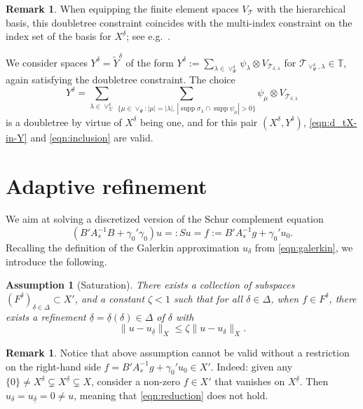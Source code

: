 \documentclass[11pt,a4paper,oneside,english]{amsart}
\numberwithin{equation}{section}
\numberwithin{theorem}{section}
\newtheorem{assum}[theorem]{Assumption}
\theoremstyle{definition}
\newtheorem{remark}[theorem]{Remark}
\DeclareMathOperator{\supp}{supp}
\newcommand{\T}{\mathcal{T}}
\newcommand{\udelta}{{\underline{\delta}}}
\begin{document}
\begin{remark}
  When equipping the finite element spaces $V_{\T}$ with the hierarchical basis,
  this doubletree constraint coincides with the multi-index constraint on the index
  set of the basis for $X^\delta$; see e.g.~\cite{TODO}.
\end{remark}

We consider spaces $Y^\delta = \tilde Y^\delta$ of the form
$Y^\delta := \sum_{\lambda \in \vee^\delta_\Psi} \psi_\lambda \otimes V_{\T_{\delta, \lambda}}$
for $\T_{\vee^\delta_\Psi, \lambda} \in \mathbb T$, again satisfying the doubletree
constraint. The choice
\begin{equation}
  Y^\delta = \sum_{\lambda \in \vee_\Sigma^\delta} \sum_{\{\mu \in \vee_\Psi\colon |\mu|=|\lambda|,\,
  |\supp \sigma_\lambda \cap \supp \psi_\mu|>0\}} \psi_\mu \otimes V_{\T_{\delta,\lambda}}
  \label{eqn:generate-Ydelta}
\end{equation}
is a doubletree by virtue of $X^\delta$ being one, and for this pair $(X^\delta, Y^\delta)$,
\eqref{eqn:d_tX-in-Y} and \eqref{eqn:inclusion} are valid.

\section{Adaptive refinement}
We aim at solving a discretized version of the Schur complement equation
\begin{equation}
  \label{eqn:schur}
 (B' A_s^{-1} B + \gamma_0' \gamma_0)u =: Su = f := B' A_s^{-1}g+\gamma_0' u_0.
\end{equation}
Recalling the definition of the Galerkin approximation $u_\delta$ from \eqref{eqn:galerkin},
we introduce the following.


\begin{assum}[Saturation] \label{assum:saturation}
There exists a collection of subspaces $(F^\delta)_{\delta \in \Delta} \subset X'$, and
a constant $\zeta<1$ such that for all $\delta \in \Delta$, when $f \in F^\delta$,
  there exists a refinement $\udelta = \udelta(\delta) \in \Delta$ of $\delta$ with
\begin{equation}
  \label{eqn:reduction}
  \|u-u_\udelta\|_X \leq \zeta \|u-u_\delta\|_X.
\end{equation}
\end{assum}
\begin{remark} \label{data-oscillation}
  Notice that above assumption cannot be valid without a restriction on the
  right-hand side $f =B' A_s^{-1}g+\gamma_0' u_0\in X'$. Indeed: given any
  $\{0\} \neq X^\delta \subsetneq X^{\udelta} \subsetneq X$, consider a non-zero
  $f \in X'$ that vanishes on $X^{\udelta}$. Then $u_\delta=u_\udelta=0 \neq u$,
  meaning that \eqref{eqn:reduction} does not hold.
\end{remark}
\end{document}
